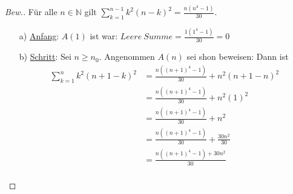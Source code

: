 \documentclass{exam}
\begin{document}
        \begin{proof}[Bew.]
            Für alle $n \in \mathbb{N}$ gilt $\sum_{k = 1}^{n - 1} k^2(n - k)^2 = \frac{n(n^4 - 1)}{30}$.
            \begin{enumerate}
                \item[a)] \underline{Anfang}: $A(1)$ ist war: $Leere\ Summe = \frac{1(1^4 - 1)}{30} = 0$ 
                \item[b)] \underline{Schritt}: Sei $n \ge n_0$. Angenommen $A(n)$ sei shon beweisen: Dann ist 
                    \begin{align}
                        \sum_{k = 1}^{n} k^2(n + 1 - k)^2 &= \frac{n((n+1)^4 - 1)}{30} + n^2(n+1-n)^2 \\
                        &= \frac{n((n+1)^4 - 1)}{30} + n^2(1)^2 \\
                        &= \frac{n((n+1)^4 - 1)}{30} + n^2 \\
                        &= \frac{n((n+1)^4 - 1)}{30} + \frac{30n^2}{30} \\
                        &= \frac{n((n+1)^4 - 1) + 30n^2}{30} \\
                    \end{align}
            \end{enumerate}
        \end{proof}
\end{document}
